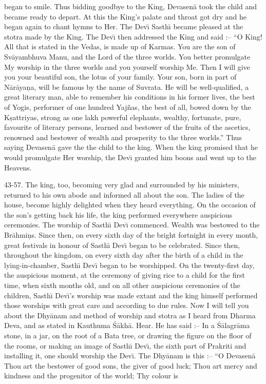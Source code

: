 began to smile. Thus bidding goodbye to the King, Devasen\=a took the child and became ready to depart. At this the King's palate and throat got dry and he began again to chant hymns to Her. The Dev\={\i} Sasth\={\i} became pleased at the stotra made by the King. The Dev\={\i} then addressed the King and said :-- ``O King! All that is stated in the Vedas, is made up of Karmas. You are the son of Sv\=ayambhuva Manu, and the Lord of the three worlds. You better promulgate My worship in the three worlds and you yourself worship Me. Then I will give you your beautiful son, the lotus of your family. Your son, born in part of N\=ar\=aya\d{n}a, will be famous by the name of Suvrata. He will be well-qualified, a great literary man, able to remember his conditions in his former lives, the best of Yogis, performer of one hundred Yaj\~nas, the best of all, bowed down by the K\d{s}attriyas, strong as one lakh powerful elephants, wealthy, fortunate, pure, favourite of literary persons, learned and bestower of the fruits of the ascetics, renowned and bestower of wealth and prosperity to the three worlds.'' Thus saying Devasen\=a gave the the child to the king. When the king promised that he would promulgate Her worship, the Dev\={\i} granted him boons and went up to the Heavens.

43-57. The king, too, becoming very glad and surrounded by his ministers, returned to his own abode and informed all about the son. The ladies of the house, become highly delighted when they heard everything. On the occasion of the son's getting back his life, the king performed everywhere auspicious ceremonies. The worship of Sasth\={\i} Dev\={\i} commenced. Wealth was bestowed to the Br\=ahmi\d{n}s. Since then, on every sixth day of the bright fortnight in every month, great festivals in honour of Sasth\={\i} Dev\={\i} began to be celebrated. Since then, throughout the kingdom, on every sixth day after the birth of a child in the lying-in-chamber, Sasth\={\i} Dev\={\i} began to be worshipped. On the twenty-first day, the auspicious moment, at the ceremony of giving rice to a child for the first time, when sixth months old, and on all other auspicious ceremonies of the children, Sasth\={\i} Dev\={\i}'s worship was made extant and the king himself performed those worships with great care and according to due rules. Now I will tell you about the Dhy\=anam and method of worship and stotra as I heard from Dharma Deva, and as stated in Kauthuma \'S\=akh\=a. Hear. He has said :-- In a \'S\=alagr\=ama stone, in a jar, on the root of a Bata tree, or drawing the figure on the floor of the rooms, or making an image of Sasth\={\i} Dev\={\i}, the sixth part of Prakriti and installing it, one should worship the Dev\={\i}. The Dhy\=anam is this :-- ``O Devasen\=a Thou art the bestower of good sons, the giver of good luck; Thou art mercy and kindness and the progenitor of the world; Thy colour is

